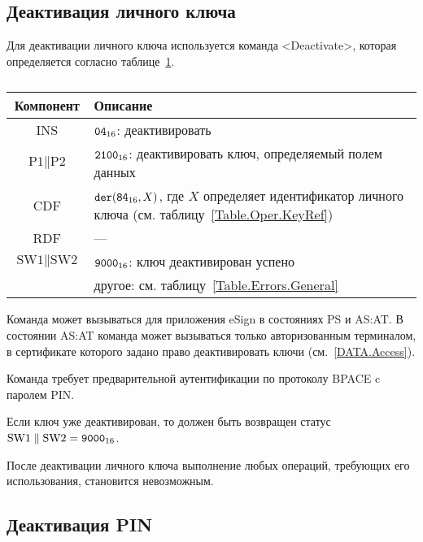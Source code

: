 \subsection{Деактивация личного ключа}
\label{Oper.Descr.DeactivateKey} 

Для деактивации личного ключа 
используется команда <Deactivate>,
которая определяется согласно 
таблице~\ref{Table.Oper.DeactivateKeyCmd}.

\begin{table}[hbt]
\caption{}\label{Table.Oper.DeactivateKeyCmd}
\begin{tabular}{|c|p{14cm}|}
\hline
Компонент & Описание\\
\hline
\hline
INS & $\texttt{04}_{16}$: деактивировать\\
\hline
$\text{P1} \parallel \text{P2}$ & $\texttt{2100}_{16}$: 
деактивировать ключ, определяемый полем данных\\
\hline
CDF &  $\texttt{der}(\texttt{84}_{16}, X)$,   
где $X$ определяет идентификатор личного ключа 
(см. таблицу~\ref{Table.Oper.KeyRef})\\
\hline 
RDF & --- \\
\hline
$\text{SW1} \parallel \text{SW2}$ & 
$\texttt{9000}_{16}$: ключ деактивирован успено \\
  & другое: см. таблицу~\ref{Table.Errors.General} \\
\hline
\end{tabular}
\end{table}

Команда может вызываться для приложения eSign в состояниях 
PS и AS:AT. В состоянии AS:AT команда может вызываться 
только авторизованным терминалом, в сертификате которого задано право
деактивировать ключи (см.~\ref{DATA.Access}).

Команда требует предварительной аутентификации по 
протоколу BPACE c паролем PIN. 

Если ключ уже деактивирован, то должен быть возвращен статус
$\text{SW1} \parallel \text{SW2} = \texttt{9000}_{16}$.

После деактивации личного ключа выполнение любых операций, 
требующих его использования, становится невозможным.

\subsection{Деактивация PIN}
\label{Oper.Descr.DeactivatePIN} 

